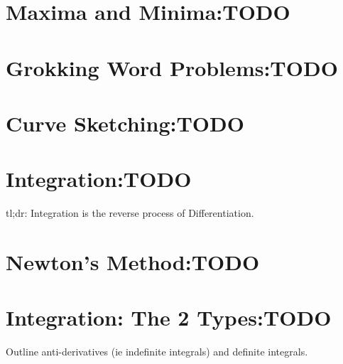 \section{Maxima and Minima:TODO}
\label{sec:MaximaAndMinima}
\lipsum[1]
\section{Grokking Word Problems:TODO}
\label{sec:GrokkingWordProblems}
\lipsum[1]
\section{Curve Sketching:TODO}
\label{sec:CurveSketching}
\lipsum[1]
\section{Integration:TODO}
\label{sec:Integration}
tl;dr: Integration is the reverse process of Differentiation.
\section{Newton's Method:TODO}
\label{sec:NewtonsMethod}
\lipsum[1]
\section{Integration: The 2 Types:TODO}
\label{sec:IntegrationThe2Types}
Outline anti-derivatives (ie indefinite integrals) and definite integrals.
